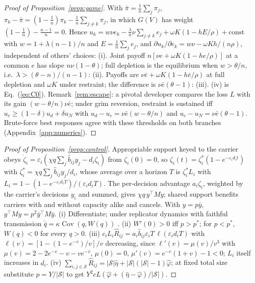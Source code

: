 \documentclass[letterpaper]{article} %
\theoremstyle{definition}
\newcommand{\cS}{\mathcal{S}}
\begin{document}
\begin{proof}[Proof of Proposition~\ref{prop:game}]
With $\bar\pi=\frac1n\sum_j\pi_j$, $\pi_k-\bar\pi=(1-\frac1n)\pi_k-\frac1n\sum_{j\neq k}\pi_j$, in which $G(V)$ has weight $(1-\frac1n)-\frac{n-1}{n}=0$. Hence $u_k=w\nu e_k-\frac\lambda n\nu\sum_{j\ne k}e_j+\omega K(1-hE/\rho)+\text{const}$ with $w=1+\lambda(n-1)/n$ and $E=\frac1n\sum_je_j$, and $\partial u_k/\partial e_k=w\nu-\omega Kh/(n\rho)$, independent of others' choices: (i). Joint payoff $n[\nu e+\omega K(1-he/\rho)]$ at a common $e$ has slope $n\nu(1-\theta)$; full depletion is the equilibrium when $w>\theta/n$, i.e.\ $\lambda>(\theta-n)/(n-1)$: (ii). Payoffs are $\nu\bar e+\omega K(1-h\bar e/\rho)$ at full depletion and $\omega K$ under restraint; the difference is $\nu\bar e(\theta-1)$: (iii). (iv) is Eq.~(\ref{eq:C0}). Remark~\ref{rem:escape}: a pivotal developer compares the loss $L$ with its gain $(w-\theta/n)\nu\bar e$; under grim reversion, restraint is sustained iff $u_c\ge(1-\delta)u_d+\delta u_N$ with $u_d-u_c=\nu\bar e(w-\theta/n)$ and $u_c-u_N=\nu\bar e(\theta-1)$. Brute-force best responses agree with these thresholds on both branches (Appendix~\ref{app:numerics}).
\end{proof}

\begin{proof}[Proof of Proposition~\ref{prop:control}]
Appropriable support keyed to the carrier obeys $\dot\zeta_i=\varepsilon_i(\chi q\sum_j\hat b_{ij}y_j-d_i\zeta_i)$ from $\zeta_i(0)=0$, so $\zeta_i(t)=\zeta^\ast_i(1-e^{-\varepsilon_id_it})$ with $\zeta^\ast_i=\chi q\sum_j\hat b_{ij}y_j/d_i$, whose average over a horizon $T$ is $\zeta^\ast_iL_i$ with $L_i=1-(1-e^{-\varepsilon_id_iT})/(\varepsilon_id_iT)$. The per-decision advantage $a_i\zeta_i$, weighted by the carrier's decisions $y_i$ and summed, gives $\chi q\,y^\top My$; shared support benefits carriers with and without capacity alike and cancels. With $y=p\bar y$, $y^\top My=p^2\bar y^\top M\bar y$. (i) Differentiate; under replicator dynamics with faithful transmission $\dot{\bar q}=\kappa\operatorname{Cov}(q,W(q))$ \citep{price1970}. (ii) $W'(0)>0$ iff $p>p^\ast$; for $p<p^\ast$, $W(q)<0$ for every $q>0$. (iii) $c_iL_i\hat R_{ij}=a_i\hat b_{ij}\varepsilon_iT\,\ell(\varepsilon_id_iT)$ with $\ell(v)=[1-(1-e^{-v})/v]/v$ decreasing, since $\ell'(v)=\mu(v)/v^3$ with $\mu(v)=2-2e^{-v}-v-ve^{-v}$, $\mu(0)=0$, $\mu'(v)=e^{-v}(1+v)-1<0$; $L_i$ itself increases in $d_i$. (iv) $\sum_{i,j\in\cS}\hat R_{ij}=|\cS|\hat\eta+|\cS|(|\cS|-1)\hat\varphi$; at fixed total size substitute $p=Y/|\cS|$ to get $Y^2cL(\hat\varphi+(\hat\eta-\hat\varphi)/|\cS|)$.
\end{proof}
\end{document}
